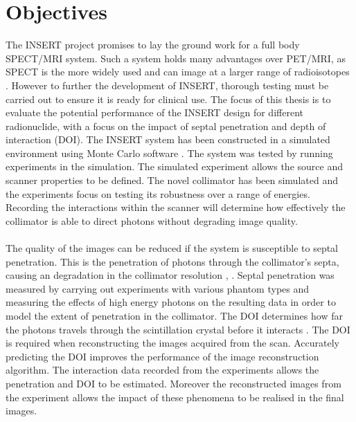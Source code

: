 \section{Objectives}
The INSERT project promises to lay the ground work for a full body SPECT/MRI system. Such a system holds many advantages over PET/MRI, as SPECT is the more widely used and can image at a larger range of radioisotopes \cite{doi:10.1177/153303460600500406}. However to further the development of INSERT, thorough testing must be carried out to ensure it is ready for clinical use. The focus of this thesis is to evaluate the potential performance of the INSERT design for different radionuclide, with a focus on the impact of septal penetration and depth of interaction (DOI). The INSERT system has been constructed in a simulated environment using Monte Carlo software \cite{1236960}. The system was tested by running experiments in the simulation. The simulated experiment allows the source and scanner properties to be defined. The novel collimator has been simulated and the experiments focus on testing its robustness over a range of energies. Recording the interactions within the scanner will determine how effectively the collimator is able to direct photons without degrading image quality.
\paragraph{} 
The quality of the images can be reduced if the system is susceptible to septal penetration. This is the penetration of photons through the collimator's septa, causing an degradation in the collimator resolution \cite{0031-9155-18-6-005}, \cite{0031-9155-50-21-004}. Septal penetration was measured by carrying out experiments with various phantom types and measuring the effects of high energy photons on the resulting data in order to model the extent of penetration in the collimator. The DOI determines how far the photons travels through the scintillation crystal before it interacts \cite{0031-9155-55-2-N04}. The DOI is required when reconstructing the images acquired from the scan. Accurately predicting the DOI improves the performance of the image reconstruction algorithm. The interaction data recorded from the experiments allows the penetration and DOI to be estimated. Moreover the reconstructed images from the experiment allows the impact of these phenomena to be realised in the final images.

